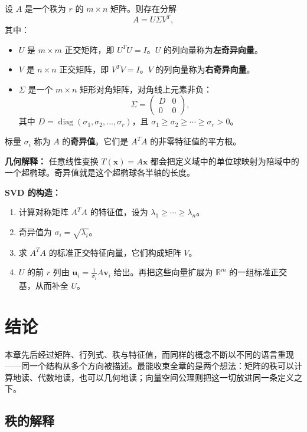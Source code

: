 \begin{theorem}[奇异值分解]
设 $A$ 是一个秩为 $r$ 的 $m\times n$ 矩阵。则存在分解
\[ A=U\Sigma V^T, \]
其中：
\begin{itemize}
    \item $U$ 是 $m\times m$ 正交矩阵，即 $U^TU=I$。$U$ 的列向量称为\textbf{左奇异向量}。
    \item $V$ 是 $n\times n$ 正交矩阵，即 $V^TV=I$。$V$ 的列向量称为\textbf{右奇异向量}。
    \item $\Sigma$ 是一个 $m\times n$ 矩形对角矩阵，对角线上元素非负：
    \[ \Sigma=\begin{pmatrix}D&0\\0&0\end{pmatrix}, \]
    其中 $D=\operatorname{diag}(\sigma_1,\sigma_2,\dots,\sigma_r)$，且 $\sigma_1\geq\sigma_2\geq\cdots\geq\sigma_r>0$。
\end{itemize}
标量 $\sigma_i$ 称为 $A$ 的\textbf{奇异值}。它们是 $A^TA$ 的非零特征值的平方根。
\end{theorem}

\textbf{几何解释：}
任意线性变换 $T(\mathbf{x})=A\mathbf{x}$ 都会把定义域中的单位球映射为陪域中的一个超椭球。奇异值就是这个超椭球各半轴的长度。

\textbf{SVD 的构造：}
\begin{enumerate}
    \item 计算对称矩阵 $A^TA$ 的特征值，设为 $\lambda_1\geq\cdots\geq\lambda_n$。
    \item 奇异值为 $\sigma_i=\sqrt{\lambda_i}$。
    \item 求 $A^TA$ 的标准正交特征向量，它们构成矩阵 $V$。
    \item $U$ 的前 $r$ 列由 $\mathbf{u}_i=\frac{1}{\sigma_i}A\mathbf{v}_i$ 给出。再把这些向量扩展为 $\mathbb{R}^m$ 的一组标准正交基，从而补全 $U$。
\end{enumerate}

\section{结论}

本章先后经过矩阵、行列式、秩与特征值，而同样的概念不断以不同的语言重现——同一个结构从多个方向被描述。最能收束全章的是两个想法：矩阵的秩可以计算地读、代数地读，也可以几何地读；向量空间公理则把这一切放进同一条定义之下。

\subsection{秩的解释}

